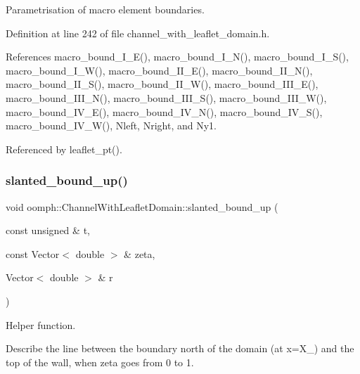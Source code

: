 Parametrisation of macro element boundaries. 



Definition at line 242 of file channel\+\_\+with\+\_\+leaflet\+\_\+domain.\+h.



References macro\+\_\+bound\+\_\+\+I\+\_\+\+E(), macro\+\_\+bound\+\_\+\+I\+\_\+\+N(), macro\+\_\+bound\+\_\+\+I\+\_\+\+S(), macro\+\_\+bound\+\_\+\+I\+\_\+\+W(), macro\+\_\+bound\+\_\+\+I\+I\+\_\+\+E(), macro\+\_\+bound\+\_\+\+I\+I\+\_\+\+N(), macro\+\_\+bound\+\_\+\+I\+I\+\_\+\+S(), macro\+\_\+bound\+\_\+\+I\+I\+\_\+\+W(), macro\+\_\+bound\+\_\+\+I\+I\+I\+\_\+\+E(), macro\+\_\+bound\+\_\+\+I\+I\+I\+\_\+\+N(), macro\+\_\+bound\+\_\+\+I\+I\+I\+\_\+\+S(), macro\+\_\+bound\+\_\+\+I\+I\+I\+\_\+\+W(), macro\+\_\+bound\+\_\+\+I\+V\+\_\+\+E(), macro\+\_\+bound\+\_\+\+I\+V\+\_\+\+N(), macro\+\_\+bound\+\_\+\+I\+V\+\_\+\+S(), macro\+\_\+bound\+\_\+\+I\+V\+\_\+\+W(), Nleft, Nright, and Ny1.



Referenced by leaflet\+\_\+pt().

\mbox{\label{classoomph_1_1ChannelWithLeafletDomain_aaca0af9c2a638c80bd8af783b9972599}} 
\subsubsection{\texorpdfstring{slanted\+\_\+bound\+\_\+up()}{slanted\_bound\_up()}}
{\footnotesize\ttfamily void oomph\+::\+Channel\+With\+Leaflet\+Domain\+::slanted\+\_\+bound\+\_\+up (\begin{DoxyParamCaption}\item[{const unsigned \&}]{t,  }\item[{const Vector$<$ double $>$ \&}]{zeta,  }\item[{Vector$<$ double $>$ \&}]{r }\end{DoxyParamCaption})\hspace{0.3cm}{\ttfamily [protected]}}



Helper function. 

Describe the line between the boundary north of the domain (at x=X\+\_) and the top of the wall, when zeta goes from 0 to 1. 

